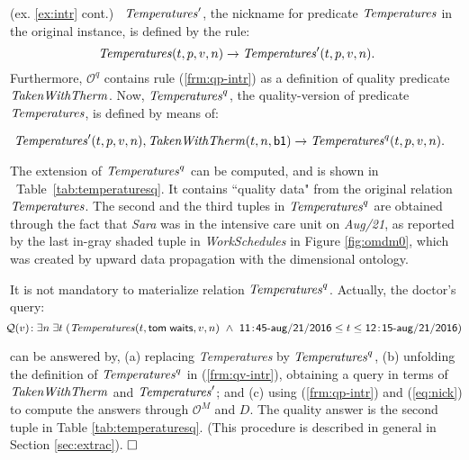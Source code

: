 \documentclass[format=acmsmall, review=false, screen=true]{acmart}
\newcommand{\boxtheorem}{\ensuremath{\hfill \Box}}
\newcommand{\mc}[1]{\mathcal{ #1}}
\newcommand{\nit}[1]{{\it #1}}
\newcommand{\red}[1]{{#1}}
\begin{document}
\begin{example} \label{ex:quality} (ex. \ref{ex:intr} cont.) \ $\nit{Temperatures}'$, the nickname  for predicate $\nit{Temperatures}$ in the original instance, is defined by the rule: \begin{equation}\nit{Temperatures}(t,p,v,n) \rightarrow \nit{Temperatures}'(t,p,v,n).\label{eq:nick}\end{equation}
Furthermore, $\mc{O}^q$ contains rule (\ref{frm:qp-intr}) as a definition of quality predicate $\nit{TakenWithTherm}$.
Now, $\nit{Temperatures}^q$, the quality-version of predicate $\nit{Temperatures}$, is defined by means of:

\vspace{-4mm}
\begin{equation}
\hspace{-4mm}\nit{Temperatures}'(t,p,v,n),\nit{TakenWithTherm}(t,n,{\sf b1}) \rightarrow \nit{Temperatures}^q(t,p,v,n). \label{frm:qv-intr}
\end{equation}

The extension of $\nit{Temperatures}^q$ can be computed, and is shown in \ Table~\ref{tab:temperaturesq}. It contains ``quality data"  from the original relation $\nit{Temperatures}$.
The second and the third tuples in $\nit{Temperatures}^q$ are obtained through the fact that {\it Sara} was in the intensive care unit on {\it Aug/21}, as reported by the last in-gray shaded tuple in {\it WorkSchedules} in Figure \ref{fig:omdm0}, which was created by upward data propagation with the dimensional ontology.





It is not mandatory to materialize relation $\nit{Temperatures}^q$. Actually, the doctor's query:
{\small \begin{equation}\!\!\!\mc{Q}(v)\!:\exists n\;\exists t\;(\nit{Temperatures}(t,{\sf tom\;waits},v,n) \ \wedge \ {\sf 11\!:\!45\mbox{-}aug\mbox{/}21\mbox{/}2016} \le t \le {\sf 12\!:\!15\mbox{-}aug\mbox{/}21\mbox{/}2016})\label{frm:q}\vspace{-4mm}\end{equation}}
\phantom{oo}

\noindent
can be answered by, (a) replacing \nit{Temperatures} by $\nit{Temperatures}^q$, (b) unfolding the definition of $\nit{Temperatures}^q$ in (\ref{frm:qv-intr}), obtaining a query in terms of  $\nit{TakenWithTherm}$ and
$\nit{Temperatures}'$; and (c) using (\ref{frm:qp-intr}) and (\ref{eq:nick}) to compute the answers through $\mc{O}^M$ and $D$. The quality answer is
the second tuple in Table \ref{tab:temperaturesq}. \red{(This procedure is described in general in Section \ref{sec:extrac}).}
\boxtheorem
\end{example}
\end{document}
